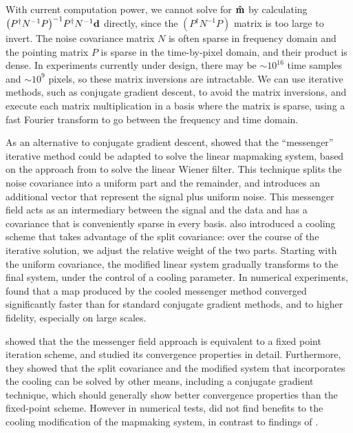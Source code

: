 \documentclass[twocolumn,linenumbers]{aastex631}
\newcommand{\vbd}{\vb{d}}
\newcommand{\inv}[1]{#1^{-1}}
\newcommand{\hatm}{\vb{\hat{m}}}
\newcommand{\Pdagger}{P^{\dagger}}
\newcommand{\PPinv}[1]{\inv{\qty(\Pdagger #1 P)}}
\begin{document}
With current computation power, we cannot solve for $\hatm$
by calculating $\PPinv{\inv{N}} \Pdagger \inv{N} \vbd$ directly, since the $(P^\dag \inv{N}P)$ matrix is too large to invert.  The noise covariance matrix $N$ is often sparse in frequency domain and the pointing matrix $P$ is sparse in the time-by-pixel domain, and their product is dense.   In experiments currently under design, there may be $\sim 10^{16}$ time samples and $\sim 10^{9}$ pixels, so these matrix inversions are intractable.
We can use iterative methods, such as conjugate gradient descent, to avoid the matrix inversions, and execute each matrix multiplication in a basis where the matrix is sparse, using a fast Fourier transform to go between the frequency and time domain.

As an alternative to conjugate gradient descent, \citet{Huffenberger_2018} showed that the ``messenger'' iterative method could be adapted to solve the linear mapmaking system, based on the  approach from \cite{2013A&A...549A.111E} to solve the linear Wiener filter.  This technique splits the noise covariance into a uniform part and the remainder, and introduces an additional vector that represent the signal plus uniform noise.  This messenger field acts as an intermediary between the signal and the data and has a covariance that is conveniently sparse in every basis.  \cite{2013A&A...549A.111E} also introduced a cooling scheme that takes  advantage of the split covariance: over the course of the iterative solution, we adjust the relative weight of the two parts.  Starting with the uniform covariance, the modified linear system gradually transforms to the final system, under the control of a cooling parameter.  In numerical experiments, \citet{Huffenberger_2018} found that a map produced by the cooled messenger method converged significantly faster than for standard conjugate gradient methods, and to higher fidelity, especially on large scales.  

\citet{2018A&A...620A..59P} showed that the the messenger field approach is equivalent to a fixed point iteration scheme, and studied its convergence properties in detail.  Furthermore, they showed that the split covariance and the modified system that incorporates the cooling can be solved by other means, including a conjugate gradient technique, which should generally show better convergence properties than the fixed-point scheme. However in numerical tests, \citet{2018A&A...620A..59P} did not find benefits to the cooling modification of the mapmaking system, in contrast to findings of \citet{Huffenberger_2018}.
\end{document}
